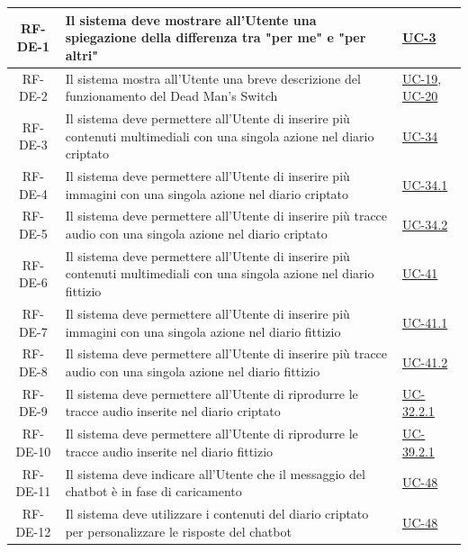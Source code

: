 \documentclass[a4paper,12pt]{article}
\begin{document}
\begin{center}
\begin{longtable}{|c|p{8.5cm}|>{\centering\arraybackslash}p{4cm}|}
\rowcolor{white}
RF-DE-1 & Il sistema deve mostrare all'Utente una spiegazione della differenza tra "per me" e "per altri" & \hyperref[subsec:UC-3]{UC-3} \\
\hline
\rowcolor{gray!20}
RF-DE-2 & Il sistema mostra all'Utente una breve descrizione del funzionamento del Dead Man's Switch & \hyperref[sec:UC-19]{UC-19}, \hyperref[sec:UC-20]{UC-20} \\
\hline
\rowcolor{white}
RF-DE-3 & Il sistema deve permettere all'Utente di inserire più contenuti multimediali con una singola azione nel diario criptato & \hyperref[subsec:UC-34]{UC-34} \\
\hline
\rowcolor{gray!20}
RF-DE-4 & Il sistema deve permettere all'Utente di inserire più immagini con una singola azione nel diario criptato & \hyperref[subsec:UC-34.1]{UC-34.1} \\
\hline
\rowcolor{white}
RF-DE-5 & Il sistema deve permettere all'Utente di inserire più tracce audio con una singola azione nel diario criptato & \hyperref[subsec:UC-34.2]{UC-34.2} \\
\hline
\rowcolor{gray!20}
RF-DE-6 & Il sistema deve permettere all'Utente di inserire più contenuti multimediali con una singola azione nel diario fittizio & \hyperref[subsec:UC-41]{UC-41} \\
\hline
\rowcolor{white}
RF-DE-7 & Il sistema deve permettere all'Utente di inserire più immagini con una singola azione nel diario fittizio & \hyperref[subsec:UC-41.1]{UC-41.1} \\
\hline
\rowcolor{gray!20}
RF-DE-8 & Il sistema deve permettere all'Utente di inserire più tracce audio con una singola azione nel diario fittizio & \hyperref[subsec:UC-41.2]{UC-41.2} \\
\hline
\rowcolor{white}
RF-DE-9 & Il sistema deve permettere all'Utente di riprodurre le tracce audio inserite nel diario criptato & \hyperref[subsec:UC-32.2.1]{UC-32.2.1} \\
\hline
\rowcolor{gray!20}
RF-DE-10 & Il sistema deve permettere all'Utente di riprodurre le tracce audio inserite nel diario fittizio & \hyperref[subsec:UC-39.2.1]{UC-39.2.1} \\
\hline
\rowcolor{white}
RF-DE-11 & Il sistema deve indicare all'Utente che il messaggio del chatbot è in fase di caricamento & \hyperref[sec:UC-48]{UC-48} \\
\hline
\rowcolor{gray!20}
RF-DE-12 & Il sistema deve utilizzare i contenuti del diario criptato per personalizzare le risposte del chatbot & \hyperref[sec:UC-48]{UC-48} \\

\end{longtable}
\end{center}
\end{document}
